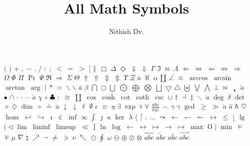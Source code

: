 \title{All Math Symbols}
\author{Nithish Dv.}
\everymath{\displaystyle}

\maketitle
  $($
  $)$
  $+$
  $,$
  $-$
  $.$
  $/$
  $:$
  $;$
  $<$
  $=$
  $>$
  $[$
  $\Arrowvert$
  $\Box$
  $\Delta$
  $\Diamond$
  $\Downarrow$
  $\Downarrow$
  $\Gamma$
  $\Im$
  $\Join$
  $\Lambda$
  $\Leftarrow$
  $\Leftrightarrow$
  $\Longleftarrow$
  $\Longleftrightarrow$
  $\Longrightarrow$
  $\Omega$
  $\Phi$
  $\Pi$
  $\Pr$
  $\Psi$
  $\Re$
  $\Rightarrow$
  $\Sigma$
  $\Theta$
  $\Uparrow$
  $\Uparrow$
  $\Updownarrow$
  $\Updownarrow$
  $\Upsilon$
  $\Xi$
  $\acute{a}$
  $\aleph$
  $\alpha$
  $\amalg$
  $\angle$
  $\approx$
  $\arccos$
  $\arcsin$
  $\arctan$
  $\arg$
  $\arrowvert$
  $\ast$
  $\asymp$
  $\backslash$
  $\backslash$
  $\bar{a}$
  $\beta$
  $\bigcap$
  $\bigcirc$
  $\bigcup$
  $\bigodot$
  $\bigoplus$
  $\bigotimes$
  $\bigsqcup$
  $\bigtriangledown$
  $\bigtriangleup$
  $\biguplus$
  $\bigvee$
  $\bigwedge$
  $\bot$
  $\bowtie$
  $\bracevert$
  $\breve{a}$
  $\bullet$
  $\cap$
  $\cdot$
  $\cdotp$
  $\cdots$
  $\check{a}$
  $\chi$
  $\circ$
  $\clubsuit$
  $\colon$
  $\cong$
  $\coprod$
  $\cos$
  $\cosh$
  $\cot$
  $\coth$
  $\csc$
  $\cup$
  $\dagger$
  $\dashv$
  $\ddagger$
  $\ddots$
  $\ddot{a}$
  $\deg$
  $\delta$
  $\det$
  $\diamond$
  $\diamondsuit$
  $\dim$
  $\div$
  $\doteq$
  $\dot{a}$
  $\downarrow$
  $\downarrow$
  $\ell$
  $\emptyset$
  $\epsilon$
  $\equiv$
  $\eta$
  $\exists$
  $\exp$
  $\flat$
  $\forall$
  $\frac{abc}{xyz}$
  $\frown$
  $\gamma$
  $\gamma$
  $\gcd$
  $\geq$
  $\gg$
  $\grave{a}$
  $\hat{a}$
  $\hbar$
  $\heartsuit$
  $\hom$
  $\hookleftarrow$
  $\hookrightarrow$
  $\imath$
  $\in$
  $\inf$
  $\infty$
  $\int$
  $\jmath$
  $\kappa$
  $\ker$
  $\lambda$
  $\langle$
  $\lceil$
  $\ldotp$
  $\ldots$
  $\leadsto$
  $\leftarrow$
  $\leftharpoondown$
  $\leftharpoonup$
  $\leftrightarrow$
  $\leq$
  $\lfloor$
  $\lg$
  $\lgroup$
  $\lhd$
  $\lim$
  $\liminf$
  $\limsup$
  $\ll$
  $\lmoustache$
  $\ln$
  $\log$
  $\longleftarrow$
  $\longleftrightarrow$
  $\longmapsto$
  $\longrightarrow$
  $\mapsto$
  $\max$
  $\mho$
  $\mid$
  $\min$
  $\models$
  $\mp$
  $\mu$
  $\nabla$
  $\natural$
  $\nearrow$
  $\neg$
  $\neq$
  $\ni$
  $\nu$
  $\nwarrow$
  $\odot$
  $\oint$
  $\omega$
  $\ominus$
  $\oplus$
  $\oslash$
  $\otimes$
  $\overbrace{abc}$
  $\overleftarrow{abc}$
  $\overline{abc}$
  $\overrightarrow{abc}$
